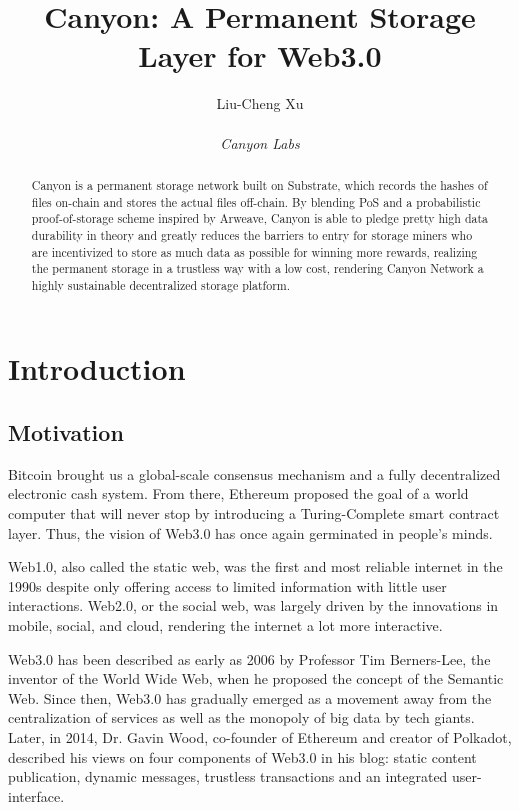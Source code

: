 \documentclass[]{article}
\title{Canyon: A Permanent Storage Layer for Web3.0}
\author{
    Liu-Cheng Xu\\
    \\
    \textit{Canyon Labs}
}
\date{}
\begin{document}
\maketitle

\begin{abstract}

Canyon is a permanent storage network built on Substrate, which records the hashes of files on-chain and stores the actual files off-chain. By blending PoS and a probabilistic proof-of-storage scheme inspired by Arweave, Canyon is able to pledge pretty high data durability in theory and greatly reduces the barriers to entry for storage miners who are incentivized to store as much data as possible for winning more rewards, realizing the permanent storage in a trustless way with a low cost, rendering Canyon Network a highly sustainable decentralized storage platform.

\end{abstract}

\tableofcontents

\newpage

\section{Introduction}

\subsection{Motivation}

Bitcoin\cite{bitcoin} brought us a global-scale consensus mechanism and a fully decentralized electronic cash system. From there, Ethereum\cite{ethereum} proposed the goal of a world computer that will never stop by introducing a Turing-Complete smart contract layer. Thus, the vision of Web3.0 has once again germinated in people's minds.

Web1.0, also called the static web, was the first and most reliable internet in the 1990s despite only offering access to limited information with little user interactions. Web2.0, or the social web, was largely driven by the innovations in mobile, social, and cloud, rendering the internet a lot more interactive.

Web3.0 has been described as early as 2006 by Professor Tim Berners-Lee, the inventor of the World Wide Web, when he proposed the concept of the Semantic Web. Since then, Web3.0 has gradually emerged as a movement away from the centralization of services as well as the monopoly of big data by tech giants. Later, in 2014, Dr. Gavin Wood, co-founder of Ethereum and creator of Polkadot, described his views on four components of Web3.0\cite{gav2014web3} in his blog: static content publication, dynamic messages, trustless transactions and an integrated user-interface.
\end{document}
